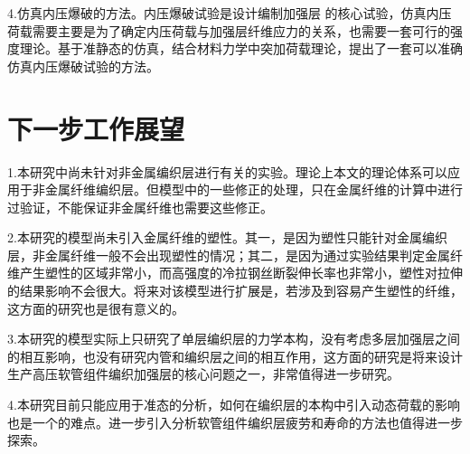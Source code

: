 4.仿真内压爆破的方法。内压爆破试验是设计编制加强层 的核心试验，仿真内压荷载需要主要是为了确定内压荷载与加强层纤维应力的关系，也需要一套可行的强度理论。基于准静态的仿真，结合材料力学中突加荷载理论，提出了一套可以准确仿真内压爆破试验的方法。



\section{下一步工作展望}

1.本研究中尚未针对非金属编织层进行有关的实验。理论上本文的理论体系可以应用于非金属纤维编织层。但模型中的一些修正的处理，只在金属纤维的计算中进行过验证，不能保证非金属纤维也需要这些修正。

2.本研究的模型尚未引入金属纤维的塑性。其一，是因为塑性只能针对金属编织层，非金属纤维一般不会出现塑性的情况；其二，是因为通过实验结果判定金属纤维产生塑性的区域非常小，而高强度的冷拉钢丝断裂伸长率也非常小，塑性对拉伸的结果影响不会很大。将来对该模型进行扩展是，若涉及到容易产生塑性的纤维，这方面的研究也是很有意义的。

3.本研究的模型实际上只研究了单层编织层的力学本构，没有考虑多层加强层之间的相互影响，也没有研究内管和编织层之间的相互作用，这方面的研究是将来设计生产高压软管组件编织加强层的核心问题之一，非常值得进一步研究。

4.本研究目前只能应用于准态的分析，如何在编织层的本构中引入动态荷载的影响也是一个的难点。进一步引入分析软管组件编织层疲劳和寿命的方法也值得进一步探索。

